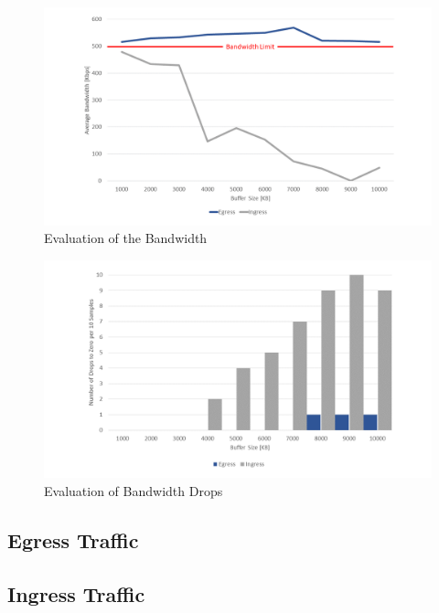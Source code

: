 \begin{figure}[h]
	\centering
	\includegraphics[width=\textwidth]{img/Evaluation-Bandwidth.png}
	\caption{Evaluation of the Bandwidth}
	\label{Evaluation of the Bandwidth}
\end{figure}

\begin{figure}[h]
	\centering
	\includegraphics[width=\textwidth]{img/Evaluation-Zeros.png}
	\caption{Evaluation of Bandwidth Drops}
	\label{Evaluation of the Bandwidth Drops}
\end{figure}

\subsection{Egress Traffic}



\subsection{Ingress Traffic}



